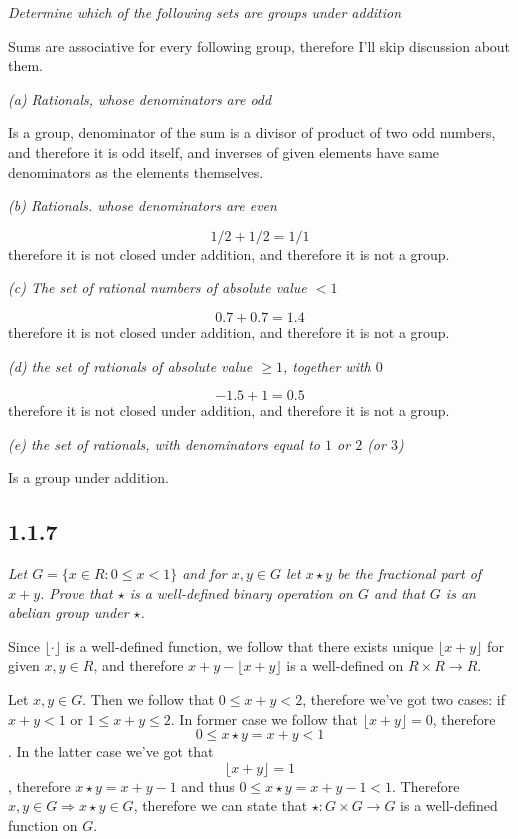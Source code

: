 \documentclass[11pt,oneside,titlepage]{book}
\DeclareMathOperator \ra {\Rightarrow}
\begin{document}
\textit{Determine which of the following sets are groups under addition}

Sums are associative for every following group, therefore I'll skip discussion about them.

\textit{(a) Rationals, whose denominators are odd}

Is a group, denominator of the sum is a divisor
of product of two odd numbers, and therefore it is odd itself, and inverses of given
elements have same denominators as the elements themselves.

\textit{(b) Rationals. whose denominators are even}

$$1/2 + 1/2 = 1/1$$
therefore it is not closed under addition, and therefore it is not a group.

\textit{(c) The set of rational numbers of absolute value $< 1$}

$$0.7 + 0.7 = 1.4$$
therefore it is not closed under addition, and therefore it is not a group.

\textit{(d) the set of rationals of absolute value $ \geq 1$, together with $0$}

$$-1.5 + 1 = 0.5$$
therefore it is not closed under addition, and therefore it is not a group.

\textit{(e) the set of rationals, with denominators equal to $1$ or $2$ (or $3$)}

Is a group under addition.

\subsection*{1.1.7}

\textit{Let $G = \{x \in R: 0 \leq x < 1\}$ and for $x, y \in G$ let $x \star y$
  be the fractional part of $x + y$. Prove that $\star$ is a well-defined binary
  operation on $G$ and that $G$ is an abelian group under $\star$.}

Since $\lfloor \cdot \rfloor$ is a well-defined function, we follow that
there exists unique $\lfloor x + y \rfloor$ for given $x, y \in R$,
and therefore $x + y - \lfloor x + y \rfloor$ is a well-defined on $R \times R \to R$.

Let $x, y \in G$. Then we follow that $0 \leq x + y < 2$, therefore
we've got two cases: if $x + y < 1$ or $1 \leq x + y  \leq 2$. In former
case we follow that $\lfloor x + y \rfloor = 0$, therefore
$$0 \leq x \star y = x + y < 1$$. In the latter case we've got that
$$\lfloor x + y \rfloor = 1$$, therefore $x \star y = x + y - 1$ and thus
$0 \leq x \star y = x + y - 1 < 1$. 
Therefore $x, y \in G \ra x \star y \in G$, therefore we can state
that $\star: G \times G \to G$ is a well-defined function on $G$.
\end{document}
